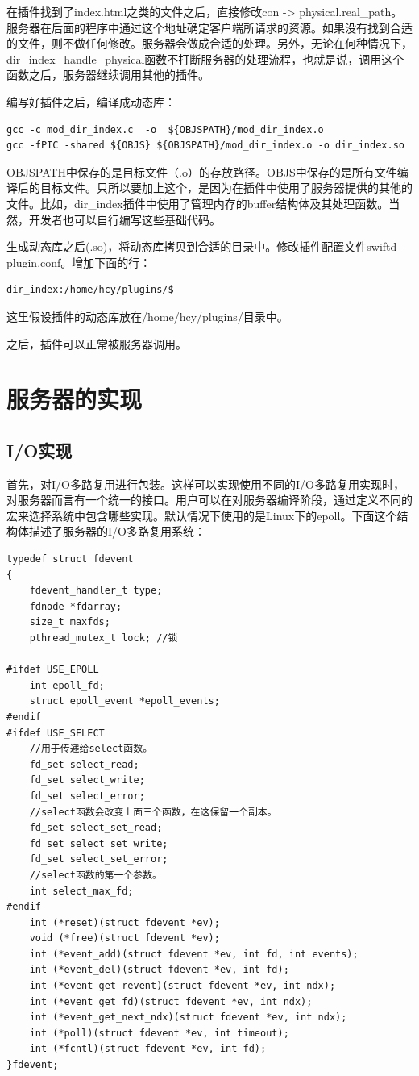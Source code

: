\documentclass[12pt, twoside, a4paper, xetex]{report}
\begin{document}
	在插件找到了index.html之类的文件之后，直接修改con -> physical.real\_path。服务器在后面的程序中通过这个地址确定客户端所请求的资源。如果没有找到合适的文件，则不做任何修改。服务器会做成合适的处理。另外，无论在何种情况下，dir\_index\_handle\_physical函数不打断服务器的处理流程，也就是说，调用这个函数之后，服务器继续调用其他的插件。
	
	编写好插件之后，编译成动态库：
	
	\begin{verbatim}
gcc -c mod_dir_index.c  -o  ${OBJSPATH}/mod_dir_index.o
gcc -fPIC -shared ${OBJS} ${OBJSPATH}/mod_dir_index.o -o dir_index.so
	\end{verbatim}
	
	OBJSPATH中保存的是目标文件（.o）的存放路径。OBJS中保存的是所有文件编译后的目标文件。只所以要加上这个，是因为在插件中使用了服务器提供的其他的文件。比如，dir\_index插件中使用了管理内存的buffer结构体及其处理函数。当然，开发者也可以自行编写这些基础代码。
	
	生成动态库之后(.so)，将动态库拷贝到合适的目录中。修改插件配置文件swiftd-plugin.conf。增加下面的行：
	
	\begin{verbatim}
dir_index:/home/hcy/plugins/$
	\end{verbatim}
	
	这里假设插件的动态库放在/home/hcy/plugins/目录中。
	
	之后，插件可以正常被服务器调用。
	
\section{服务器的实现}

\subsection{I/O实现}
	首先，对I/O多路复用进行包装。这样可以实现使用不同的I/O多路复用实现时，对服务器而言有一个统一的接口。用户可以在对服务器编译阶段，通过定义不同的宏来选择系统中包含哪些实现。默认情况下使用的是Linux下的epoll。下面这个结构体描述了服务器的I/O多路复用系统：
	
\begin{verbatim}	
typedef struct fdevent
{
	fdevent_handler_t type;
	fdnode *fdarray;
	size_t maxfds;
	pthread_mutex_t lock; //锁

#ifdef USE_EPOLL
	int epoll_fd;
	struct epoll_event *epoll_events;
#endif
#ifdef USE_SELECT
	//用于传递给select函数。
	fd_set select_read;
	fd_set select_write;
	fd_set select_error;
	//select函数会改变上面三个函数，在这保留一个副本。
	fd_set select_set_read;
	fd_set select_set_write;
	fd_set select_set_error;
	//select函数的第一个参数。
	int select_max_fd;
#endif
	int (*reset)(struct fdevent *ev);
	void (*free)(struct fdevent *ev);
	int (*event_add)(struct fdevent *ev, int fd, int events);
	int (*event_del)(struct fdevent *ev, int fd);
	int (*event_get_revent)(struct fdevent *ev, int ndx);
	int (*event_get_fd)(struct fdevent *ev, int ndx);
	int (*event_get_next_ndx)(struct fdevent *ev, int ndx);
	int (*poll)(struct fdevent *ev, int timeout);
	int (*fcntl)(struct fdevent *ev, int fd);
}fdevent;
\end{verbatim}
\end{document}
